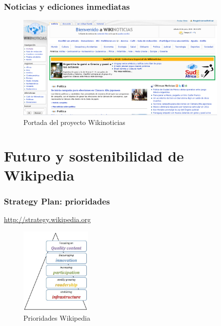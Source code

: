 
\begin{frame}
\frametitle{Noticias y ediciones inmediatas}

    \begin{figure}[htp]
    \centering
    \includegraphics[width=10.5cm]{figs/wikinews.png}
    \caption{Portada del proyecto Wikinoticias}
    \end{figure}

\end{frame}


\section{Futuro y sostenibilidad de Wikipedia}


\begin{frame}
\frametitle{Strategy Plan: prioridades}

\url{http://strategy.wikipedia.org}

    \begin{figure}[htp]
    \centering
    \includegraphics[width=3.5cm]{figs/Strategywiki-stability-priorities.jpg}
    \caption{Prioridades Wikipedia}
    \end{figure}

\end{frame}

